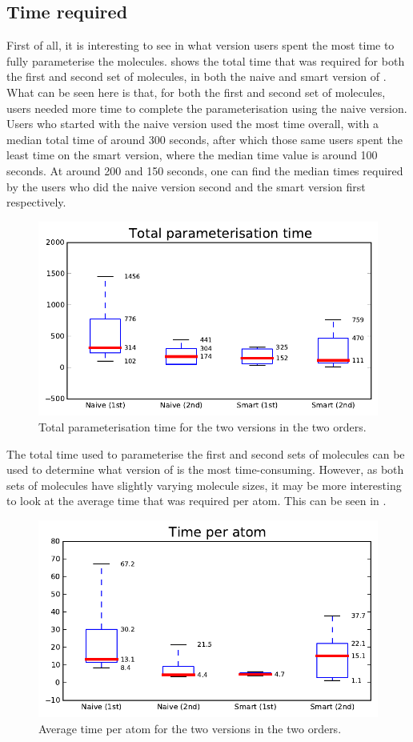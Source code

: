 \subsection{Time required}
First of all, it is interesting to see in what version users spent the most time to fully parameterise the molecules.  shows the total time that was required for both the first and second set of molecules, in both the naive and smart version of \oframp. What can be seen here is that, for both the first and second set of molecules, users needed more time to complete the parameterisation using the naive version. Users who started with the naive version used the most time overall, with a median total time of around 300 seconds, after which those same users spent the least time on the smart version, where the median time value is around 100 seconds. At around 200 and 150 seconds, one can find the median times required by the users who did the naive version second and the smart version first respectively.

\begin{figure}[h!]
\center
\includegraphics[width=.6\textwidth]{img/graphs/1a_02.pdf}
\caption{Total parameterisation time for the two versions in the two orders.}
\end{figure}

The total time used to parameterise the first and second sets of molecules can be used to determine what version of \oframp{} is the most time-consuming. However, as both sets of molecules have slightly varying molecule sizes, it may be more interesting to look at the average time that was required per atom. This can be seen in .

\begin{figure}[h!]
\center
\includegraphics[width=.6\textwidth]{img/graphs/1a_03.pdf}
\caption{Average time per atom for the two versions in the two orders.}
\end{figure}

